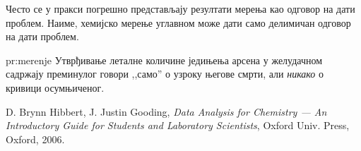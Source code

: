 Често се у пракси погрешно представљају резултати мерења као одговор
на дати проблем. Наиме, хемијско мерење углавном може дати само делимичан
одговор на дати проблем.
\begin{pr}[]{pr:merenje}
  Утврђивање леталне количине једињења арсена у желудачном садржају
  преминулог говори ,,само'' о узроку његове смрти, али \emph{никако}
  о кривици осумњиченог.
\end{pr}

\begin{thebibliography}{9}
 D. Brynn Hibbert, J. Justin Gooding, \textit{Data Analysis
  for Chemistry --- An Introductory Guide for Students and Laboratory
  Scientists\/}, Oxford Univ. Press, Oxford, 2006.
\end{thebibliography}
